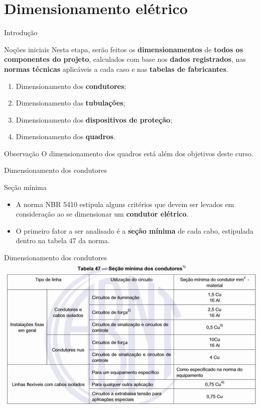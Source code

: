 \section{Dimensionamento elétrico}


\begin{frame}{Introdução}
	\begin{block}{Noções iniciais}
		Nesta etapa, serão feitos os \textbf{dimensionamentos} de \textbf{todos os componentes do projeto}, calculados com base nos \textbf{dados registrados}, nas \textbf{normas técnicas }aplicáveis a cada caso e nas \textbf{tabelas de fabricantes}.

		\begin{enumerate}[a]
			\item Dimensionamento dos \textbf{condutores};
			\item Dimensionamento das \textbf{tubulações};
			\item Dimensionamento dos \textbf{dispositivos de proteção};
			\item Dimensionamento dos \textbf{quadros}.
		\end{enumerate}
	\end{block}

	\begin{block}{Observação}
		O dimensionamento dos quadros está além dos objetivos deste curso.
	\end{block}
\end{frame}


\begin{frame}{Dimensionamento dos condutores}
	\begin{block}{Seção mínima}
		\begin{itemize}
			\item A norma NBR 5410 estipula alguns critérios que devem ser levados em consideração ao se dimensionar um \textbf{condutor elétrico}.
			\item O primeiro fator a ser analisado é a \textbf{seção mínima} de cada cabo, estipulada dentro na tabela 47 da norma.
		\end{itemize}
	\end{block}
\end{frame}


\begin{frame}{Dimensionamento dos condutores}
	\centering
	\includegraphics[width=1\linewidth]{Figuras/Ch06/fig1}
\end{frame}


